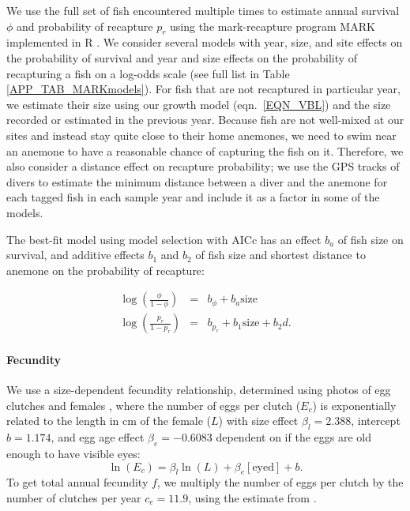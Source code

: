\documentclass[12pt, oneside]{article}   	%
\begin{document}
We use the full set of fish encountered multiple times to estimate annual survival $\phi$ and probability of recapture $p_r$ using the mark-recapture program MARK implemented in R \citep{RMark_Laake2013}. We consider several models with year, size, and site effects on the probability of survival and year and size effects on the probability of recapturing a fish on a log-odds scale (see full list in Table \ref{APP_TAB_MARKmodels}). For fish that are not recaptured in particular year, we estimate their size using our growth model (eqn.\ \ref{EQN_VBL}) and the size recorded or estimated in the previous year. Because fish are not well-mixed at our sites and instead stay quite close to their home anemones, we need to swim near an anemone to have a reasonable chance of capturing the fish on it. Therefore, we also consider a distance effect on recapture probability; we use the GPS tracks of divers to estimate the minimum distance between a diver and the anemone for each tagged fish in each sample year and include it as a factor in some of the models.

The best-fit model using model selection with AICc has an effect $b_a$ of fish size on survival, and additive effects $b_1$ and $b_2$ of fish size and shortest distance to anemone on the probability of recapture:

\begin{eqnarray}
\log(\frac{\phi}{1-\phi}) &=& b_\phi + b_a\text{size} \\
\log(\frac{p_r}{1-p_r}) &=& b_{p_r} + b_1\text{size} + b_2d. \label{EQN_Survival}
\end{eqnarray}

\paragraph*{Fecundity}

We use a size-dependent fecundity relationship, determined using photos of egg clutches and females \citep{yawdoszynInPrepfecundity}, where the number of eggs per clutch ($E_c$) is exponentially related to the length in cm of the female ($L$) with size effect $\beta_l = 2.388$, intercept $b = 1.174$, and egg age effect $\beta_e = -0.6083$ dependent on if the eggs are old enough to have visible eyes: 
\begin{equation} %
\ln(E_c) = \beta_l\ln(L) + \beta_e[\text{eyed}] + b. \label{EQN_Fec}
\end{equation}
To get total annual fecundity $f$, we multiply the number of eggs per clutch by the number of clutches per year $c_e = 11.9$, using the estimate from \cite{holtswarth2017fecundity}.
\end{document}
